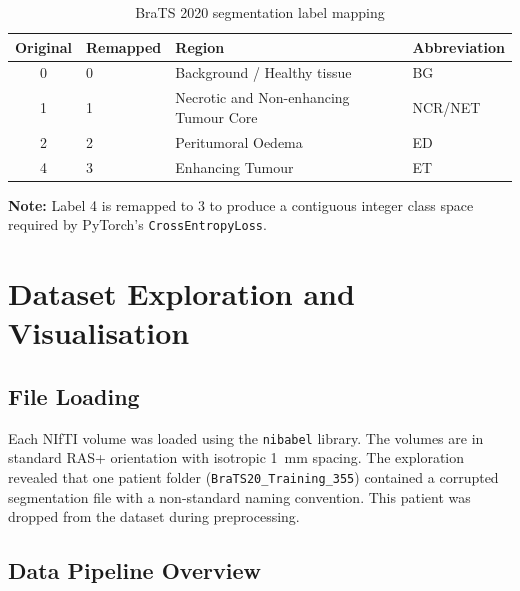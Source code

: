 \documentclass[12pt,a4paper]{report}
\begin{document}
\begin{table}[H]
\centering
\caption{BraTS 2020 segmentation label mapping}
\label{tab:labels}
\begin{tabular}{clll}
\toprule
\textbf{Original} & \textbf{Remapped} & \textbf{Region} & \textbf{Abbreviation} \\
\midrule
0 & 0 & Background / Healthy tissue & BG \\
1 & 1 & Necrotic and Non-enhancing Tumour Core & NCR/NET \\
2 & 2 & Peritumoral Oedema & ED \\
4 & 3 & Enhancing Tumour & ET \\
\bottomrule
\end{tabular}
\end{table}

\noindent\textbf{Note:} Label 4 is remapped to 3 to produce a contiguous integer class space required by PyTorch's \texttt{CrossEntropyLoss}.

\section{Dataset Exploration and Visualisation}

\subsection{File Loading}
Each NIfTI volume was loaded using the \texttt{nibabel} library. The volumes are in standard RAS+ orientation with isotropic 1~mm spacing. The exploration revealed that one patient folder (\texttt{BraTS20\_Training\_355}) contained a corrupted segmentation file with a non-standard naming convention. This patient was dropped from the dataset during preprocessing.

\subsection{Data Pipeline Overview}
\end{document}
